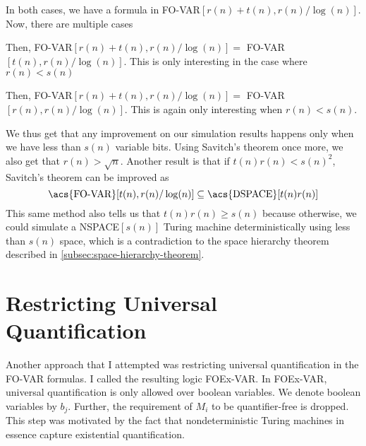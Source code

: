 In both cases, we have a formula in \acs{FO-VAR}$[r(n) + t(n), r(n)/\log(n)]$.
Now, there are multiple cases
\begin{description}
    \setlength\itemsep{0.15em}
    \item[$r(n) \leq t(n)$:]  Then, \acs{FO-VAR}$[r(n) + t(n), r(n)/\log(n)] =$ \acs{FO-VAR}$[t(n), r(n)/\log(n)]$.
    This is only interesting in the case where $r(n) < s(n)$
    \item[$r(n) > t(n)$:] Then, \acs{FO-VAR}$[r(n) + t(n), r(n)/\log(n)] =$ \acs{FO-VAR}$[r(n), r(n)/\log(n)]$.
    This is again only interesting when $r(n) < s(n)$.
\end{description}

We thus get that any improvement on our simulation results happens only when we have less than $s(n)$ variable bits.
Using Savitch's theorem once more, we also get that $r(n) > \sqrt{n}$.
Another result is that if $t(n)r(n) < s(n)^2$, Savitch's theorem can be improved as
\[
    \text{\acs{FO-VAR}}[t(n), r(n)/\log(n)] \subseteq \text{\acs{DSPACE}}[t(n)r(n)]
\]
This same method also tells us that $t(n)r(n) \geq s(n)$ because otherwise, we could simulate a \acs{NSPACE}$[s(n)]$ Turing machine deterministically using less than $s(n)$ space, which is a contradiction to the space hierarchy theorem described in \cref{subsec:space-hierarchy-theorem}.


\section{Restricting Universal Quantification}\label{sec:restricting-universal-quantification}

Another approach that I attempted was restricting universal quantification in the \acs{FO-VAR} formulas.
I called the resulting logic \acs{FOEx-VAR}\@.
In \acs{FOEx-VAR}, universal quantification is only allowed over boolean variables.
We denote boolean variables by $b_j$.
Further, the requirement of $M_i$ to be quantifier-free is dropped.
This step was motivated by the fact that nondeterministic Turing machines in essence capture existential quantification.

